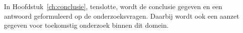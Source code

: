 	In Hoofdstuk~\ref{ch:conclusie}, tenslotte, wordt de conclusie gegeven en een antwoord geformuleerd op de onderzoeksvragen. Daarbij wordt ook een aanzet gegeven voor toekomstig onderzoek binnen dit domein.
	









